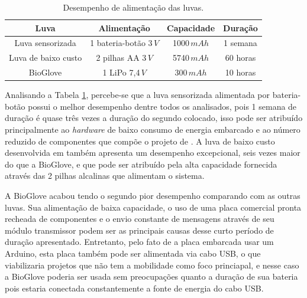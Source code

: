 \documentclass[
	12pt,				%
	openright,			%
	oneside,			%
	a4paper,			%
	english,			%
	brazil				%
	]{abntex2}
\begin{document}
		\begin{table}[H]
  	\centering
		\caption{Desempenho de alimentação das luvas.}
    \begin{tabular}{c|c|c|c}
      \midrule
			Luva 								& Alimentação							&	Capacidade	& Duração	\\
      \midrule                                            					
			Luva sensorizada 		& 1 bateria-botão	3$\,V$	& 1000$\,mAh$		& 1 semana\\
			Luva de baixo custo & 2 pilhas AA 3$\,V$			& 5740$\,mAh$		& 60 horas\\
			BioGlove						& 1 LiPo 7,4$\,V$					& 300$\,mAh$			&	10 horas\\	
      \midrule
    \end{tabular}
		\label{Tab:battery-range}
		\end{table}

		Analisando a Tabela \ref{Tab:battery-range}, percebe-se que a luva sensorizada alimentada por bateria-botão possui o melhor desempenho dentre todos os analisados, pois 1 semana de duração é quase três vezes a duração do segundo colocado, isso pode ser atribuído principalmente ao \textit{hardware} de baixo consumo de energia embarcado e ao número reduzido de componentes que compõe o projeto de \cite{michela2013rehab}. A luva de baixo custo desenvolvida em \cite{simone2007lowcost} também apresenta um desempenho excepcional, seis vezes maior do que a BioGlove, e que pode ser atribuído pela alta capacidade fornecida através das 2 pilhas alcalinas que alimentam o sistema.


		A BioGlove acabou tendo o segundo pior desempenho comparando com as outras luvas. Sua alimentação de baixa capacidade, o uso de uma placa comercial pronta recheada de componentes e o envio constante de mensagens através de seu módulo transmissor podem ser as principais causas desse curto período de duração apresentado. Entretanto, pelo fato de a placa embarcada usar um Arduino, esta placa também pode ser alimentada via cabo USB, o que viabilizaria projetos que não tem a mobilidade como foco princiapal, e nesse caso a BioGlove poderia ser usada sem preocupações quanto a duração de sua bateria pois estaria conectada constantemente a fonte de energia do cabo USB.
\end{document}
